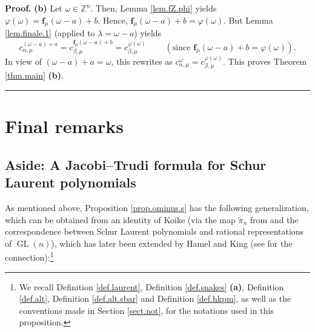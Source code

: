\documentclass[numbers=enddot,12pt,final,onecolumn,notitlepage]{scrartcl}%
\theoremstyle{definition}
\newenvironment{proof}[1][Proof]{\noindent\textbf{#1.} }{\ \rule{0.5em}{0.5em}}
\begin{document}
\begin{proof}
\textbf{(b)} Let $\omega\in\mathbb{Z}^{n}$. Then, Lemma \ref{lem.fZ.phi}
yields $\varphi\left(  \omega\right)  =\mathbf{f}_{\mu}\left(  \omega
-a\right)  +b$. Hence, $\mathbf{f}_{\mu}\left(  \omega-a\right)
+b=\varphi\left(  \omega\right)  $. But Lemma \ref{lem.finale.1} (applied to
$\lambda=\omega-a$) yields%
\[
c_{\alpha,\mu}^{\left(  \omega-a\right)  +a}=c_{\beta,\mu}^{\mathbf{f}_{\mu
}\left(  \omega-a\right)  +b}=c_{\beta,\mu}^{\varphi\left(  \omega\right)
}\ \ \ \ \ \ \ \ \ \ \left(  \text{since }\mathbf{f}_{\mu}\left(
\omega-a\right)  +b=\varphi\left(  \omega\right)  \right)  .
\]
In view of $\left(  \omega-a\right)  +a=\omega$, this rewrites as
$c_{\alpha,\mu}^{\omega}=c_{\beta,\mu}^{\varphi\left(  \omega\right)  }$. This
proves Theorem \ref{thm.main} \textbf{(b)}.
\end{proof}


\section{\label{sect.fin}Final remarks}

\subsection{\label{subsect.fin.jt}Aside: A Jacobi--Trudi formula for Schur
Laurent polynomials}

As mentioned above, Proposition \ref{prop.ominus.s} has the following
generalization, which can be obtained from an identity of Koike
\cite[Proposition 2.8]{Koike89} (via the map $\widetilde{\pi}_{n}$ from
\cite{Koike89} and the correspondence between Schur Laurent polynomials and
rational representations of $\operatorname{GL}\left(  n\right)  $), which has
later been extended by Hamel and King \cite{HamKin11} (see \cite[(6) and
(10)]{HamKin11} for the connection):\footnote{We recall Definition
\ref{def.laurent}, Definition \ref{def.snakes} \textbf{(a)}, Definition
\ref{def.alt}, Definition \ref{def.alt.sbar} and Definition \ref{def.hkpm}, as
well as the conventions made in Section \ref{sect.not}, for the notations used
in this proposition.}
\end{document}
